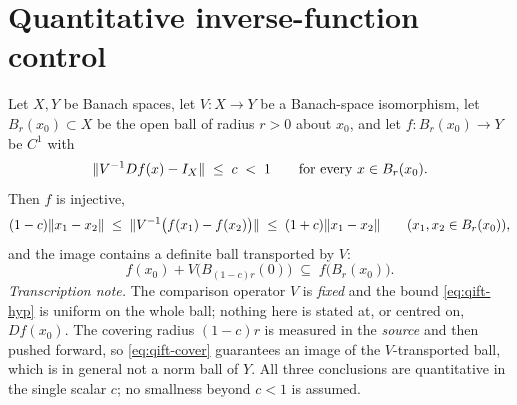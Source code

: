\section{Quantitative inverse-function control}\label{sec:stage1-quantitative-ift}

\begin{lemma}\label{lem:stage1-quantitative-inverse-function}
Let $X,Y$ be Banach spaces, let $V:X\to Y$ be a Banach-space isomorphism, let
$B_r(x_0)\subset X$ be the open ball of radius $r>0$ about $x_0$, and let
$f:B_r(x_0)\to Y$ be $C^{1}$ with
\begin{equation}\label{eq:qift-hyp}
  \lVert V^{-1}Df(x)-I_X\rVert\;\le\;c\;<\;1
  \qquad\text{for every }x\in B_r(x_0).
\end{equation}
Then $f$ is injective,
\begin{equation}\label{eq:qift-secant}
  (1-c)\lVert x_1-x_2\rVert\;\le\;\lVert V^{-1}\bigl(f(x_1)-f(x_2)\bigr)\rVert\;\le\;(1+c)\lVert x_1-x_2\rVert
  \qquad (x_1,x_2\in B_r(x_0)),
\end{equation}
and the image contains a definite ball transported by $V$:
\begin{equation}\label{eq:qift-cover}
  f(x_0)+V\bigl(B_{(1-c)r}(0)\bigr)\;\subseteq\;f\bigl(B_r(x_0)\bigr).
\end{equation}
\emph{Transcription note.} The comparison operator $V$ is \emph{fixed} and the bound
\eqref{eq:qift-hyp} is uniform on the whole ball; nothing here is stated at, or centred on,
$Df(x_0)$. The covering radius $(1-c)r$ is measured in the \emph{source} and then pushed
forward, so \eqref{eq:qift-cover} guarantees an image of the $V$-transported ball, which is
in general not a norm ball of $Y$. All three conclusions are quantitative in the single
scalar $c$; no smallness beyond $c<1$ is assumed.
\end{lemma}

